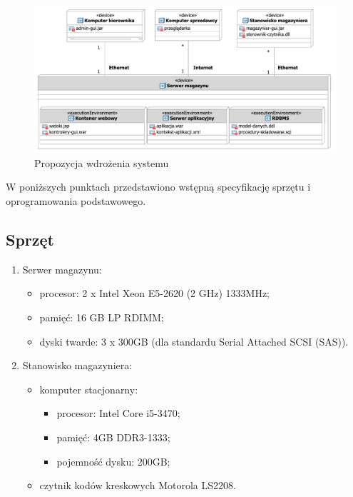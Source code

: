 \begin{figure}[p]
  \begin{center}
    \includegraphics[scale=0.7]{../img/sys/DiagramWdrozenia.pdf}
  \end{center}
  \caption{Propozycja wdrożenia systemu}
  \label{fig:DiagramWdrozenia}
\end{figure}
\FloatBarrier

W poniższych punktach przedstawiono wstępną specyfikację sprzętu i
oprogramowania podstawowego.

\subsection{Sprzęt}

\begin{enumerate}
\item Serwer magazynu:
  \begin{itemize}
  \item procesor: 2 x Intel Xeon E5-2620 (2 GHz) 1333MHz;
  \item pamięć: 16 GB LP RDIMM;
  \item dyski twarde: 3 x 300GB (dla standardu Serial Attached SCSI
    (SAS)).
  \end{itemize}
\item Stanowisko magazyniera:
  \begin{itemize}
  \item komputer stacjonarny:
    \begin{itemize}
    \item procesor: Intel Core i5-3470;
    \item pamięć: 4GB DDR3-1333;
    \item pojemność dysku: 200GB;
    \end{itemize}
  \item czytnik kodów kreskowych Motorola LS2208.
  \end{itemize}
\end{enumerate}

